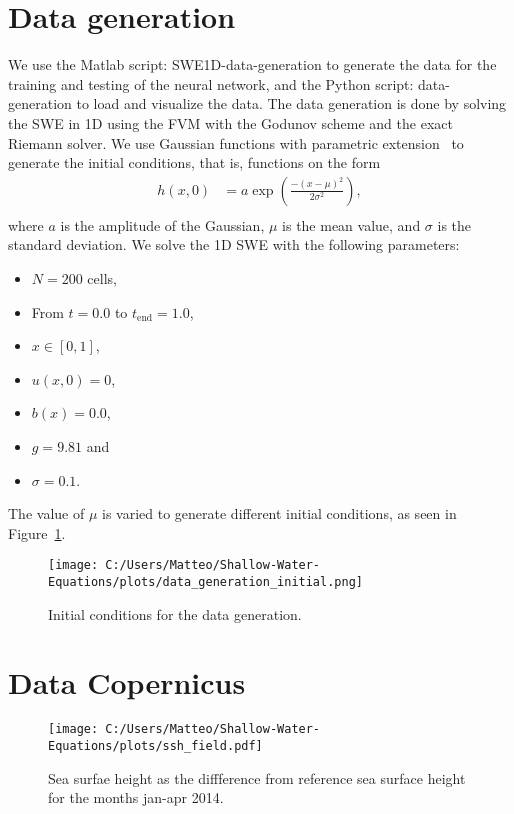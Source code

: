 \section{Data generation}
We use the Matlab script: SWE1D-data-generation to generate the data for the training and testing of the neural network, and the Python script: data-generation to load and visualize the data.
The data generation is done by solving the SWE in 1D using the FVM with the Godunov scheme and the exact Riemann solver.
We use Gaussian functions with parametric extension~\cite{Gaussian} to generate the initial conditions, that is, functions on the form
\begin{align*}
    h(x,0) &= a \exp{\left(\frac{-{(x-\mu)}^2}{2\sigma^2}\right)}, \\
\end{align*}
where $a$ is the amplitude of the Gaussian, $\mu$ is the mean value, and $\sigma$ is the standard deviation.
We solve the 1D SWE with the following parameters:
\begin{itemize}
    \item $N = 200$ cells,
    \item From $t = 0.0$ to $t_{\text{end}} = 1.0$,
    \item $x \in [0, 1]$,
    \item $u(x,0) = 0$,
    \item $b(x) = 0.0$,
    \item $g = 9.81$ and
    \item $\sigma = 0.1$.
\end{itemize}
The value of $\mu$ is varied to generate different initial conditions, as seen in Figure~\ref{fig:data_generation_initial}.
\begin{figure}[H]
    \centering
    \texttt{[image: C:/Users/Matteo/Shallow-Water-Equations/plots/data\_generation\_initial.png]}
    \caption{Initial conditions for the data generation.}\label{fig:data_generation_initial}
\end{figure}


\section{Data Copernicus}

\begin{figure}[H]
    \centering
    \texttt{[image: C:/Users/Matteo/Shallow-Water-Equations/plots/ssh\_field.pdf]}
    \caption{Sea surfae height as the diffference from reference sea surface height for the months jan-apr 2014.}\label{fig:copernices-ssh}
\end{figure}


